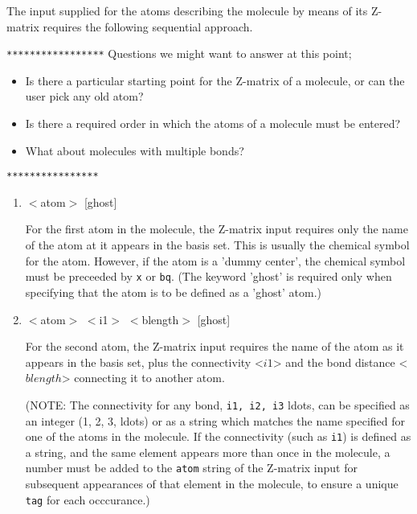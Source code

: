 The input supplied for the atoms describing the molecule by means of its
Z-matrix requires the following sequential approach.

\verb+*****************+
Questions we might want to answer at this point;
\begin{itemize}
\item Is there a particular starting point for the Z-matrix of a molecule,
or can the user pick any old atom?
\item Is there a required order in which the atoms of a molecule must be
entered?
\item What about molecules with multiple bonds?
\end{itemize}
\verb+****************+

\begin{enumerate}

   \item $<$atom$>$ [ghost]

    For the first atom in the molecule, the Z-matrix input requires only  
    the name of the atom at it appears in the basis set.  This is usually 
    the chemical symbol for the atom.
    However, if the atom is a 'dummy center', the chemical symbol must
    be preceeded by \verb+x+ or \verb+bq+. (The keyword 'ghost' is required
    only when specifying that the atom is to be defined as a 'ghost' atom.)

   \item $<$atom$>$ $<$i1$>$ $<$blength$>$ [ghost]

    For the second atom, the Z-matrix input requires the name of the atom
    as it appears in the basis set, 
    plus the connectivity <$i1$> and the bond distance <$blength$> 
    connecting it to another atom. 

    (NOTE: The connectivity for any bond, {\tt i1, i2, i3} ldots, 
    can be specified as an integer (1, 2, 3, ldots) or as a string 
    which matches the name specified for one of the atoms in the molecule.
    If the connectivity (such as {\tt i1}) is defined as a string,
    and the same element appears more than once in the molecule, a number
    must be added to the {\tt atom} string of the Z-matrix input for
    subsequent appearances of that element in the molecule, to ensure 
    a unique \verb+tag+ for each occcurance.)


\end{enumerate}
